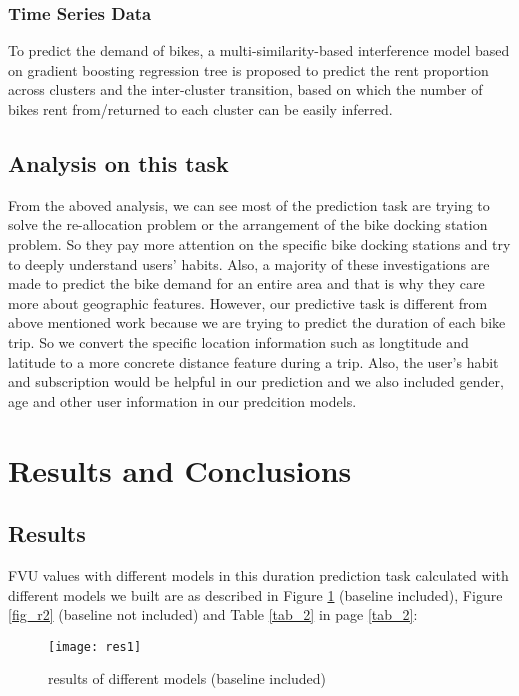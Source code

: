 \subsubsection{Time Series Data}
To predict the demand of bikes, a multi-similarity-based interference model based on gradient boosting regression tree is proposed to predict the rent proportion across clusters and the inter-cluster transition, based on which the number of bikes rent from/returned to each cluster can be easily inferred\cite{Li}. 

\subsection{Analysis on this task}
From the aboved analysis, we can see most of the prediction task are trying to solve the re-allocation problem or the arrangement of the bike docking station problem. So they pay more attention on the specific bike docking stations and try to deeply understand users' habits. Also, a majority of these investigations are made to predict the bike demand for an entire area and that is why they care more about geographic features. However, our predictive task is different from above mentioned work because we are trying to predict the duration of each bike trip. So we convert the specific location information such as longtitude and latitude to a more concrete distance feature during a trip. Also, the user's habit and subscription would be helpful in our prediction and we also included gender, age and other user information in our predcition models. 

\section{Results and Conclusions}

\subsection{Results}
FVU values with different models in this duration prediction task calculated with different models we built are as described in Figure \ref{fig_r1} (baseline included), Figure \ref{fig_r2} (baseline not included) and Table \ref{tab_2} in page \ref{tab_2}:

  \begin{figure}[h!]
  \centering
  \texttt{[image: res1]}
  \caption{results of different models (baseline included)}
  \label{fig_r1}
  \end{figure}

